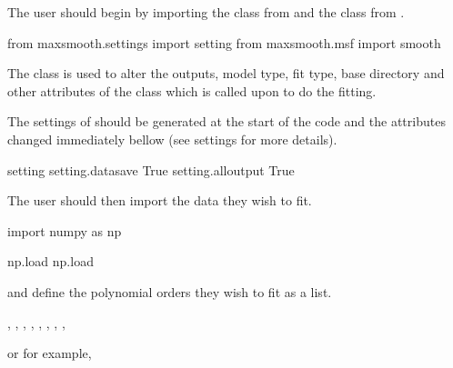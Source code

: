 \documentclass[letterpaper,10pt,english]{sphinxmanual}
\begin{document}
The user should begin by importing the  class from
 and the  class from .

\begin{sphinxVerbatim}[commandchars=\\\{\}]
from maxsmooth.settings import setting
from maxsmooth.msf import smooth
\end{sphinxVerbatim}

The  class is used to alter the outputs, model type, fit type,
base directory and other attributes of the  class which is called
upon to do the fitting.

The settings of  should be generated at the start of the code and the
attributes changed immediately bellow (see settings for more details).

\begin{sphinxVerbatim}[commandchars=\\\{\}]
  setting
setting.data\PYGZus{}save  True
setting.all\PYGZus{}output  True
\end{sphinxVerbatim}

The user should then import the data they wish to fit.

\begin{sphinxVerbatim}[commandchars=\\\{\}]
import numpy as np

  np.load
  np.load
\end{sphinxVerbatim}

and define the polynomial orders they wish to fit as a list.

\begin{sphinxVerbatim}[commandchars=\\\{\}]
  \PYG{o}{[}, , , , , , , , \PYG{o}{]}
\end{sphinxVerbatim}

or for example,

\begin{sphinxVerbatim}[commandchars=\\\{\}]
  \PYG{o}{[}\PYG{o}{]}
\end{sphinxVerbatim}
\end{document}
